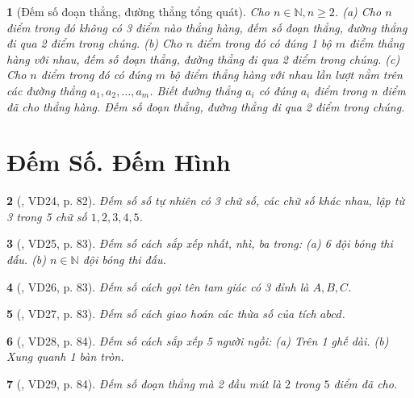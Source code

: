 \documentclass{article}
\newtheorem{baitoan}{}
\begin{document}
\begin{baitoan}[Đếm số đoạn thẳng, đường thẳng tổng quát]
	Cho $n\in\mathbb{N},n\ge2$. (a) Cho $n$ điểm trong đó không có 3 điểm nào thẳng hàng, đếm số đoạn thẳng, đường thẳng đi qua 2 điểm trong chúng. (b) Cho $n$ điểm trong đó có đúng 1 bộ $m$ điểm thẳng hàng với nhau, đếm số đoạn thẳng, đường thẳng đi qua 2 điểm trong chúng. (c) Cho $n$ điểm trong đó có đúng $m$ bộ điểm thẳng hàng với nhau lần lượt nằm trên các đường thẳng $a_1,a_2,\ldots,a_m$. Biết đường thẳng $a_i$ có đúng $a_i$ điểm trong $n$ điểm đã cho thẳng hàng. Đếm số đoạn thẳng, đường thẳng đi qua 2 điểm trong chúng.
\end{baitoan}


\section{Đếm Số. Đếm Hình}

\begin{baitoan}[\cite{Binh_Toan_6_tap_2}, VD24, p. 82]
	Đếm số số tự nhiên có 3 chữ số, các chữ số khác nhau, lập từ 3 trong 5 chữ số $1,2,3,4,5$.
\end{baitoan}

\begin{baitoan}[\cite{Binh_Toan_6_tap_2}, VD25, p. 83]
	Đếm số cách sắp xếp nhất, nhì, ba trong: (a) 6 đội bóng thi đấu. (b) $n\in\mathbb{N}$ đội bóng thi đấu.
\end{baitoan}

\begin{baitoan}[\cite{Binh_Toan_6_tap_2}, VD26, p. 83]
	Đếm số cách gọi tên tam giác có 3 đỉnh là $A,B,C$.
\end{baitoan}

\begin{baitoan}[\cite{Binh_Toan_6_tap_2}, VD27, p. 83]
	Đếm số cách giao hoán các thừa số của tích $abcd$.
\end{baitoan}

\begin{baitoan}[\cite{Binh_Toan_6_tap_2}, VD28, p. 84]
	Đếm số cách sắp xếp 5 người ngồi: (a) Trên 1 ghế dài. (b) Xung quanh 1 bàn tròn.
\end{baitoan}

\begin{baitoan}[\cite{Binh_Toan_6_tap_2}, VD29, p. 84]
	Đếm số đoạn thẳng mà 2 đầu mút là $2$ trong $5$ điểm đã cho.
\end{baitoan}
\end{document}
